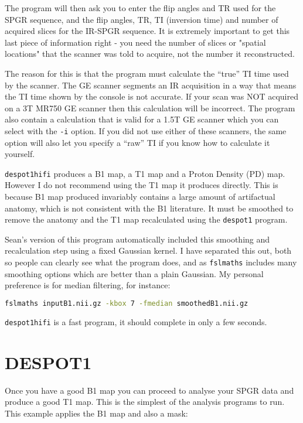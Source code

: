 \documentclass{report}
\begin{document}
The program will then ask you to enter the flip angles and TR used for the SPGR sequence, and the flip angles, TR, TI (inversion time) and number of acquired slices for the IR-SPGR sequence. It is extremely important to get this last piece of information right - you need the number of slices or "spatial locations" that the scanner was told to acquire, not the number it reconstructed.

The reason for this is that the program must calculate the ``true'' TI time used by the scanner. The GE scanner segments an IR acquisition in a way that means the TI time shown by the console is not accurate. If your scan was NOT acquired on a 3T MR750 GE scanner then this calculation will be incorrect. The program also contain a calculation that is valid for a 1.5T GE scanner which you can select with the \texttt{-i} option. If you did not use either of these scanners, the same option will also let you specify a ``raw'' TI if you know how to calculate it yourself.

\texttt{despot1hifi} produces a B1 map, a T1 map and a Proton Density (PD) map. However I do not recommend using the T1 map it produces directly. This is because B1 map produced invariably contains a large amount of artifactual anatomy, which is not consistent with the B1 literature. It must be smoothed to remove the anatomy and the T1 map recalculated using the \texttt{despot1} program.

Sean's version of this program automatically included this smoothing and recalculation step using a fixed Gaussian kernel. I have separated this out, both so people can clearly see what the program does, and as \texttt{fslmaths} includes many smoothing options which are better than a plain Gaussian. My personal preference is for median filtering, for instance:

\begin{lstlisting}[language=sh]
fslmaths inputB1.nii.gz -kbox 7 -fmedian smoothedB1.nii.gz
\end{lstlisting}

\texttt{despot1hifi} is a fast program, it should complete in only a few seconds.

\section{DESPOT1}

Once you have a good B1 map you can proceed to analyse your SPGR data and produce a good T1 map. This is the simplest of the analysis programs to run. This example applies the B1 map and also a mask:
\end{document}
